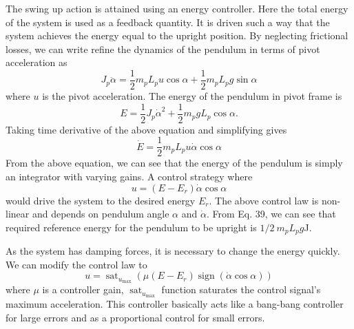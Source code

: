 \documentclass[superscriptaddress,floatfix,reprint,amssymb, amsmath,aps, pre]{revtex4-1}
\begin{document}
{{{            The swing up action is attained using an energy controller. Here the total energy of the system is used as a feedback quantity. It is driven such a way that the system achieves the energy equal to the upright position. By neglecting frictional losses, we can write refine the dynamics of the pendulum in terms of pivot acceleration as 
            \begin{equation}
                J_{p} \ddot{\alpha} = \frac{1}{2} m_{p} L_{p} u \cos \alpha + \frac{1}{2} m_{p}  L_{p} g\sin \alpha
            \end{equation}
            where \(u\) is the pivot acceleration. The energy of the pendulum in pivot frame is 
            \begin{equation}
                E=\frac{1}{2} J_{p} \dot{\alpha}^{2}+\frac{1}{2} m_{p} g L_{p}\cos \alpha.
            \end{equation}
            Taking time derivative of the above equation and simplifying gives 
            \begin{equation}
                \dot{E}= \frac{1}{2} m_{p} L_{p} u \dot{\alpha} \cos \alpha
            \end{equation}
            From the above equation, we can see that the energy of the pendulum is simply an integrator with varying gains. A control strategy where 
            \begin{equation}
                u=\left(E-E_{r}\right) \dot{\alpha} \cos \alpha
            \end{equation}
            would drive the system to the desired energy \(E_r\). The above control law is non-linear and depends on pendulum angle \(\alpha\) and \(\dot \alpha\). From Eq. 39, we can see that required reference energy for the pendulum to be upright is \(1/2 \ m_p L_p g\)J. 

            As the system has damping forces, it is necessary to change the energy quickly. We can modify the control law to 
            \begin{equation}
                u = \operatorname{sat}_{u_{\max }}\left(\mu\left(E-E_{r}\right) \operatorname{sign}(\dot{\alpha} \cos \alpha)\right) \label{eq:uControlEq}
            \end{equation}
            where \(\mu\) is a controller gain, \(\operatorname{sat}_{u_{\max }}\) function saturates the control signal's maximum acceleration. This controller basically acts like a bang-bang controller for large errors and as a proportional control for small errors.

}}}
\end{document}
